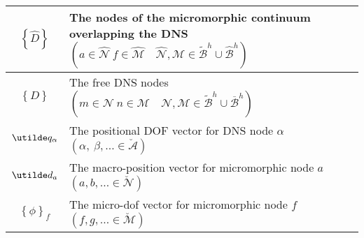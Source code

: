\begin{table}[htb!]
\begin{tabular}{|c|l|}
\hline
$\left\{\hat{D}\right\}$ & The nodes of the micromorphic continuum overlapping the DNS $\left(a \in \hat{\mathcal{N}}\ f \in \hat{\mathcal{M}}\quad \hat{\mathcal{N}},\hat{\mathcal{M}} \in \tilde{\mathcal{B}}^h \cup \hat{\mathcal{B}}^h\right)$\\
\hline
$\left\{D\right\}$ & The free DNS nodes $\left(m \in \mathcal{N}\ n \in \mathcal{M}\quad \mathcal{N},\mathcal{M} \in \tilde{\mathcal{B}}^h \cup \overline{\mathcal{B}}^h\right)$\\
\hline
$\VEC{q}_{\alpha}$  & The positional DOF vector for DNS  node $\alpha$ $\left(\alpha,\ \beta,\ldots \in \breve{\mathcal{A}}\right)$\\
\hline
$\VEC{d}_a$ & The macro-position vector for micromorphic node $a$ $\left(a,b,\ldots \in \breve{\mathcal{N}}\right)$\\
\hline
$\left\{\phi\right\}_f$ & The micro-dof vector for micromorphic node $f$ $\left(f,g,\ldots \in \breve{\mathcal{M}}\right)$\\
\hline
\end{tabular}
\end{table}

\FloatBarrier